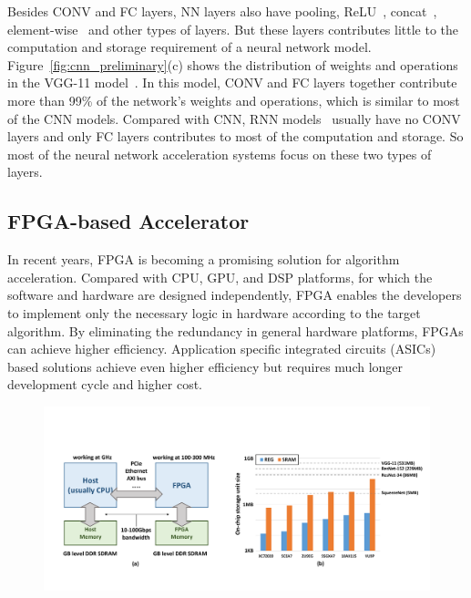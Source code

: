 Besides CONV and FC layers, NN layers also have pooling, ReLU~\cite{krizhevsky2012imagenet}, concat~\cite{szegedy2015going}, element-wise~\cite{he2016deep} and other types of layers. But these layers contributes little to the computation and storage requirement of a neural network model. Figure~\ref{fig:cnn_preliminary}(c) shows the distribution of weights and operations in the VGG-11 model~\cite{simonyan2014very}. In this model, CONV and FC layers together contribute more than 99\% of the network's weights and operations, which is similar to most of the CNN models. Compared with CNN, RNN models~\cite{hannun2014deep, amodei2016deep} usually have no CONV layers and only FC layers contributes to most of the computation and storage. So most of the neural network acceleration systems focus on these two types of layers.


\subsection{FPGA-based Accelerator}\label{sec:preliminary:fpga}

In recent years, FPGA is becoming a promising solution for algorithm acceleration. Compared with CPU, GPU, and DSP platforms, for which the software and hardware are designed independently, FPGA enables the developers to implement only the necessary logic in hardware according to the target algorithm. By eliminating the redundancy in general hardware platforms, FPGAs can achieve higher efficiency. Application specific integrated circuits (ASICs) based solutions achieve even higher efficiency but requires much longer development cycle and higher cost. 

\begin{figure}[ht]
    \centering
    \includegraphics[width=0.9\columnwidth]{fig/fpga_preliminary.pdf}
    \caption{}
    \label{fig:fpga_preliminary}
\end{figure}

